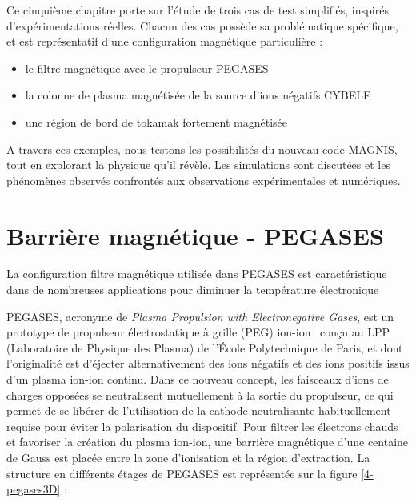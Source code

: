\label{EtudePlasmaMag}
\begin{refsection}
Ce cinquième chapitre porte sur l'étude de trois cas de test simplifiés,
inspirés d'expérimentations réelles. Chacun des cas possède sa problématique
spécifique, et est représentatif d'une configuration magnétique
particulière :

\begin{itemize}
  \item le filtre magnétique avec le propulseur PEGASES
  \item la colonne de plasma magnétisée de la source d'ions négatifs CYBELE
  \item une région de bord de tokamak fortement magnétisée
\end{itemize}

A travers ces exemples, nous testons les possibilités du nouveau code MAGNIS,
tout en explorant la physique qu'il révèle. Les simulations sont discutées et
les phénomènes observés confrontés aux observations expérimentales et
numériques.

\section{Barrière magnétique - PEGASES}
La configuration filtre magnétique utilisée dans PEGASES est caractéristique
dans de nombreuses applications pour diminuer la température électronique

PEGASES, acronyme de \emph{Plasma Propulsion with Electronegative Gases}, est
un prototype de propulseur électrostatique à grille (PEG)
ion-ion~\parencite{Chabert} conçu au LPP (Laboratoire de Physique des
Plasma) de l'École Polytechnique de Paris, et dont l'originalité est d'éjecter
alternativement des ions négatifs et des ions positifs issus d'un plasma ion-ion continu.
Dans ce nouveau concept, les faisceaux d'ions de charges opposées se
neutralisent mutuellement à la sortie du propulseur, ce qui permet de se
libérer de l'utilisation de la cathode neutralisante habituellement requise
pour éviter la polarisation du dispositif.
Pour filtrer les électrons chauds et favoriser la création du plasma ion-ion, une
barrière magnétique d'une centaine de Gauss est placée entre la zone
d'ionisation et la région d'extraction. La structure en différents étages de PEGASES est représentée sur la
figure \ref{4-pegases3D} :


\end{refsection}
